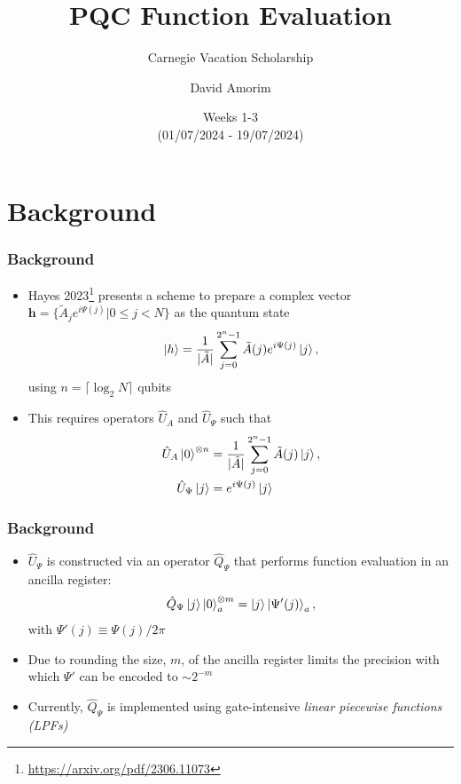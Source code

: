 \documentclass{beamer}
\title[PQC Function Evaluation]{PQC Function Evaluation}
\subtitle{Carnegie Vacation Scholarship}
\author[David Amorim]{David Amorim}
\institute[]{}
\date[22/07/2024]{Weeks 1-3 \\(01/07/2024 - 19/07/2024)}
\begin{document}
\frame{\titlepage}


\section{Background}
\begin{frame}
\frametitle{Background}

\begin{itemize}
\item Hayes 2023\footnote{\url{https://arxiv.org/pdf/2306.11073}} presents a scheme to\alert{ prepare a complex vector} $\boldsymbol{h} =\{ \tilde{A}_j e^{i \Psi (j)} | 0 \leq j < N \}$ as the quantum state 
\begin{equation}
\ket{h} = \frac{1}{|\tilde{A}|} \sum^{2^n-1}_{j=0} \tilde{A}(j) e^{i \Psi (j)} \ket{j}, 
\end{equation}
using $n = \lceil \log_2 N \rceil$ qubits
\item This requires \alert{operators $\hat{U}_A$ and $\hat{U}_\Psi$} such that 
\begin{align}
\hat{U}_A \ket{0}^{\otimes n} &=  \frac{1}{|\tilde{A}|} \sum^{2^n-1}_{j=0} \tilde{A}(j) \ket{j}, \\
\hat{U}_\Psi \ket{j} &= e^{i \Psi (j)} \ket{j}
\end{align}
\end{itemize}
\end{frame}

\begin{frame}
\frametitle{Background}
\begin{itemize}
\item $\hat{U}_\Psi$ is constructed via an operator $\hat{Q}_\Psi$ that performs \alert{function evaluation} in an ancilla register:
\begin{equation}
\hat{Q}_\Psi  \ket{j} \ket{0}^{\otimes m}_a = \ket{j} \ket{\Psi'(j)}_a,
\end{equation}
with $\Psi'(j) \equiv \Psi(j) / 2 \pi$
\item Due to rounding the size, $m$, of the ancilla register limits the precision with which $\Psi'$ can be encoded to $\sim 2^{-m}$ 
\item Currently, $\hat{Q}_\Psi$ is implemented using gate-intensive \emph{linear piecewise functions (LPFs)}
\end{itemize}
\end{frame}
\end{document}
